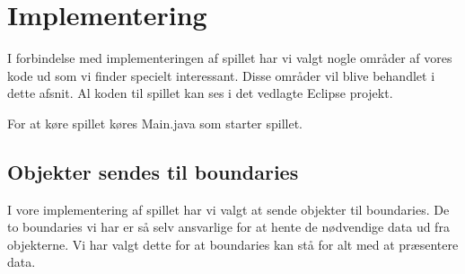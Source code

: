 \chapter{Implementering}\label{chap:implementering}
I forbindelse med implementeringen af spillet har vi valgt nogle områder af vores kode ud som vi finder specielt interessant. Disse områder vil blive behandlet i dette afsnit. Al koden til spillet kan ses i det vedlagte Eclipse projekt.

For at køre spillet køres Main.java som starter spillet.

\section{Objekter sendes til boundaries}
I vore implementering af spillet har vi valgt at sende objekter til boundaries. De to boundaries vi har er så selv ansvarlige for at hente de nødvendige data ud fra objekterne. Vi har valgt dette for at boundaries kan stå for alt med at præsentere data.